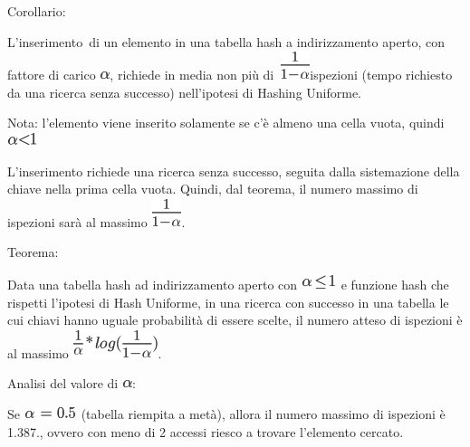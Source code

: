\documentclass{article}
\begin{document}
{}

{Corollario}{:}

{L'inserimento}{~di un elemento in una tabella hash a indirizzamento
aperto, con fattore di carico }\includegraphics{images/image327.png}{,
richiede in media }{non più
di}{~}\includegraphics{images/image321.png}{ispezioni (tempo richiesto
da una ricerca senza successo) nell'ipotesi di }{Hashing Uniforme.}

{}

{Nota: l'elemento viene inserito solamente se c'è almeno una cella
vuota, quindi }\includegraphics{images/image333.png}

{}

{L'inserimento richiede una ricerca senza successo, seguita dalla
sistemazione della chiave nella prima cella vuota. Quindi, dal teorema,
il numero massimo di ispezioni sarà al massimo
}\includegraphics{images/image321.png}{.}

{}

{Teorema}{:}

{Data una tabella hash ad indirizzamento aperto con
}\includegraphics{images/image322.png}{~e funzione hash che rispetti
l'ipotesi di Hash Uniforme, in una ricerca con successo in una tabella
le cui chiavi hanno uguale probabilità di essere scelte, il numero
atteso di ispezioni è al massimo
}\includegraphics{images/image334.png}{.}

{Analisi del valore di
}\includegraphics{images/image327.png}{:}

{Se }\includegraphics{images/image329.png}{~(tabella riempita a metà),
allora il numero massimo di ispezioni è 1.387., ovvero con meno di 2
accessi riesco a trovare l'elemento cercato.}
\end{document}
